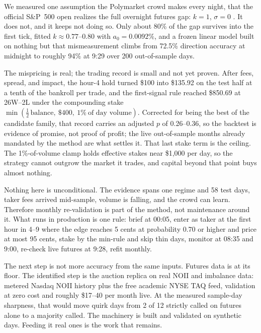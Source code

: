 \label{sec:conclusion}

We measured one assumption the Polymarket crowd makes every night, that the
official S\&P~500 open realizes the full overnight futures gap:
$k = 1$, $\sigma = 0$ \citep{polymarket2026spxmarket}. It does not, and
it keeps not doing so. Only about 80\% of the gap survives into the first
tick, fitted $k \approx 0.77$--$0.80$ with $a_0 = 0.0092\%$, and a frozen
linear model built on nothing but that mismeasurement climbs from 72.5\%
direction accuracy at midnight to roughly 94\% at 9:29 over 200
out-of-sample days.

The mispricing is real; the trading record is small and not yet proven.
After fees, spread, and impact, the
hour-4 hold turned \$100 into \$135.92 on the test half at a tenth of the
bankroll per trade, and the first-signal rule reached \$850.69 at 26W--2L
under the compounding stake $\min(\tfrac{1}{2}\,\text{balance},\ \$400,\
1\%\ \text{of day volume})$. Corrected for being the best of the candidate
family, that record carries an adjusted $p$ of 0.26--0.36, so the backtest
is evidence of promise, not proof of profit; the live out-of-sample months
already mandated by the method are what settles it. That last stake term is
the ceiling. The
1\%-of-volume clamp holds effective stakes near \$1{,}000 per day, so the
strategy cannot outgrow the market it trades, and capital beyond that point
buys almost nothing.

Nothing here is unconditional. The evidence spans one regime and 58 test
days, taker fees arrived mid-sample, volume is falling, and the crowd can
learn. Therefore monthly re-validation is part of the method, not
maintenance around it. What runs in production is one rule: brief at 00:05,
enter as taker at the first hour in 4--9 where the edge reaches 5 cents at
probability 0.70 or higher and price at most 95 cents, stake by the
min-rule and skip thin days, monitor at 08:35 and 9:00, re-check live
futures at 9:28, refit monthly.

The next step is not more accuracy from the same inputs. Futures data is at
its floor. The identified step is the auction replica on real NOII and
imbalance data: metered Nasdaq NOII history plus the free academic NYSE
TAQ feed, validation at zero cost and roughly \$17--40 per month live.
At the measured sample-day sharpness, that would move quirk days from 2
of 12 strictly called on futures alone to a majority called. The machinery
is built and validated on synthetic days. Feeding it real ones is the work
that remains.
